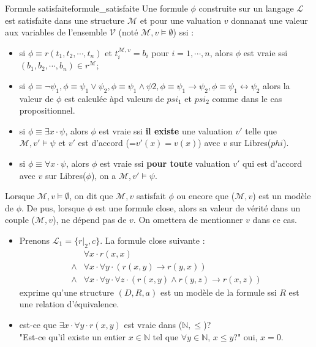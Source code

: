 \begin{theorem}{Formule satisfaite}{formule_satisfaite}
    Une formule $\phi$ construite sur un langage $\mathcal{L}$ est satisfaite dans une structure $\mathcal{M}$ et pour une valuation
    $v$ donnanat une valeur aux variables de l'ensemble $\mathcal{V}$ (noté $\mathcal{M}, v\vDash\emptyset$) ssi :
    \begin{itemize}[label=\textbullet]
        \item si $\phi\equiv r(t_1,t_2,\cdots,t_n)$ et $t_i^{\mathcal{M},v}=b_i$ pour $i=1,\cdots,n$, alors $\phi$ est vraie
        ssi $(b_1,b_2,\cdots,b_n)\in r^{\mathcal{M}}$;
        \item si $\phi\equiv\neg\psi_1, \phi\equiv\psi_1\vee\psi_2,\phi\equiv\psi_1\wedge\psi2,\phi\equiv\psi_1\rightarrow\psi_2,
        \phi\equiv\psi_1\leftrightarrow\psi_2$ alors la valeur de $\phi$ est calculée àpd valeurs de $psi_1$ et $psi_2$ comme
        dans le cas propositionnel.
        \item si $\phi\equiv\exists x\cdot\psi$, alors $\phi$ est vraie ssi \textbf{il existe} une valuation $v'$ telle que $\mathcal{M},v'\vDash
        \psi$ et $v'$ est d'accord (=$v'(x)=v(x)$) avec $v$ sur Libres($phi$).
        \item si $\phi\equiv\forall x\cdot\psi$, alors $\phi$ est vraie ssi \textbf{pour toute} valuation $v'$ qui est d'accord avec $v$ sur
        Libres($\phi$), on a $\mathcal{M},v'\vDash\psi$.
    \end{itemize}
\end{theorem}
Lorsque $\mathcal{M},v\vDash\emptyset$, on dit que $\mathcal{M},v$ satisfait $\phi$ ou encore que ($\mathcal{M},v$) est un modèle de $\phi$.
De pus, lorsque $\phi$ est une formule close, alors sa valeur de vérité dans un couple ($\mathcal{M},v$), ne dépend pas de $v$.
On omettera de mentionner $v$ dans ce cas.
\begin{example}
    \begin{itemize}[label=\textbullet]
        \item Prenons $\mathcal{L}_1=\{r|_2,c\}$. La formule close suivante :
        \begin{equation*}
            \begin{aligned}
                &\forall x\cdot r(x,x)\\
                \wedge&\forall x\cdot\forall y\cdot(r(x,y)\rightarrow r(y,x))\\
                \wedge&\forall x\cdot\forall y\cdot\forall z\cdot(r(x,y)\wedge r(y,z)\rightarrow r(x,z))
            \end{aligned}
        \end{equation*}
        exprime qu'une structure $(D,R,a)$ est un modèle de la formule ssi $R$ est une relation d'équivalence.
        \item est-ce que $\exists x\cdot \forall y\cdot r(x,y)$ est vraie dans ($\mathbb{N},\leq$)?\\
        "Est-ce qu'il existe un entier $x\in\mathbb{N}$ tel que $\forall y\in\mathbb{N}$, $x\leq y$?" oui, $x=0$.
        
    \end{itemize}
\end{example}

